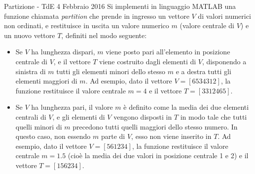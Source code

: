 \documentclass[format=169, 10pt, handout]{beamer}
\begin{document}
\begin{frame}[allowframebreaks]{Partizione - TdE 4 Febbraio 2016}
Si implementi in linguaggio MATLAB una funzione chiamata \emph{partition} che prende in ingresso un  
vettore $V$ di valori numerici non ordinati, e restituisce in uscita un valore numerico $m$ (valore  
centrale di $V$) e un nuovo vettore $T$, definiti nel modo seguente:  

\framebreak

\begin{itemize}
	\item Se $V$ ha lunghezza dispari, $m$ viene posto pari all'elemento in posizione centrale di $V$, e il  
vettore $T$ viene costruito dagli elementi di $V$, disponendo a sinistra di $m$ tutti gli elementi minori  
dello stesso $m$ e a destra tutti gli elementi maggiori di $m$.  
Ad esempio, dato il vettore $V = [6 5 3 4 3 1 2]$, la funzione restituisce il valore centrale $m = 4$ e  
il vettore $T = [ 3 3 1 2 4 6 5]$.  

	\item Se $V$ ha lunghezza pari, il valore $m$ è definito come la media dei due elementi centrali di $V$, e gli  
elementi di $V$ vengono disposti in $T$ in modo tale che tutti quelli minori di $m$ precedono tutti  
quelli maggiori dello stesso numero. In questo caso, non essendo $m$ parte di $V$, esso non viene  
inserito in $T$. 
Ad esempio, dato il vettore $V = [5 6 1 2 3 4]$, la funzione restituisce il valore centrale $m = 1.5$  
(cioè la media dei due valori in posizione centrale 1 e 2) e il vettore $T = [1 5 6 2 3 4]$. 
\end{itemize}
\end{frame}
\end{document}
